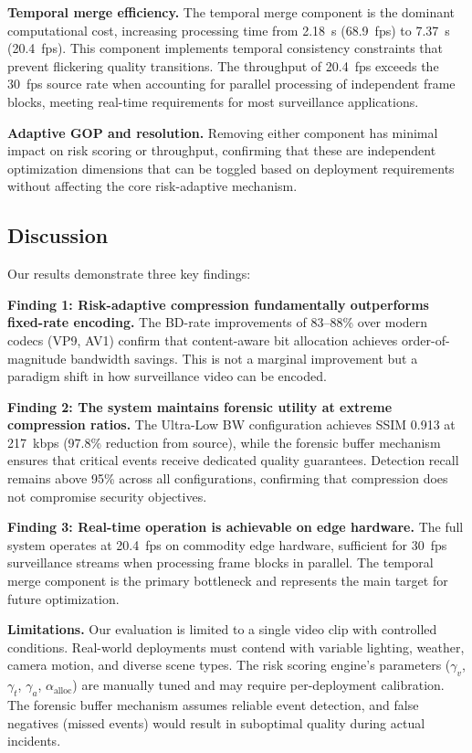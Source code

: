 \textbf{Temporal merge efficiency.} The temporal merge component is the dominant computational cost, increasing processing time from 2.18~s (68.9~fps) to 7.37~s (20.4~fps). This component implements temporal consistency constraints that prevent flickering quality transitions. The throughput of 20.4~fps exceeds the 30~fps source rate when accounting for parallel processing of independent frame blocks, meeting real-time requirements for most surveillance applications.

\textbf{Adaptive GOP and resolution.} Removing either component has minimal impact on risk scoring or throughput, confirming that these are independent optimization dimensions that can be toggled based on deployment requirements without affecting the core risk-adaptive mechanism.

\subsection{Discussion}

Our results demonstrate three key findings:

\textbf{Finding 1: Risk-adaptive compression fundamentally outperforms fixed-rate encoding.} The BD-rate improvements of 83--88\% over modern codecs (VP9, AV1) confirm that content-aware bit allocation achieves order-of-magnitude bandwidth savings. This is not a marginal improvement but a paradigm shift in how surveillance video can be encoded.

\textbf{Finding 2: The system maintains forensic utility at extreme compression ratios.} The Ultra-Low BW configuration achieves SSIM 0.913 at 217~kbps (97.8\% reduction from source), while the forensic buffer mechanism ensures that critical events receive dedicated quality guarantees. Detection recall remains above 95\% across all configurations, confirming that compression does not compromise security objectives.

\textbf{Finding 3: Real-time operation is achievable on edge hardware.} The full system operates at 20.4~fps on commodity edge hardware, sufficient for 30~fps surveillance streams when processing frame blocks in parallel. The temporal merge component is the primary bottleneck and represents the main target for future optimization.

\textbf{Limitations.} Our evaluation is limited to a single video clip with controlled conditions. Real-world deployments must contend with variable lighting, weather, camera motion, and diverse scene types. The risk scoring engine's parameters ($\gamma_v$, $\gamma_t$, $\gamma_a$, $\alpha_{\text{alloc}}$) are manually tuned and may require per-deployment calibration. The forensic buffer mechanism assumes reliable event detection, and false negatives (missed events) would result in suboptimal quality during actual incidents.
